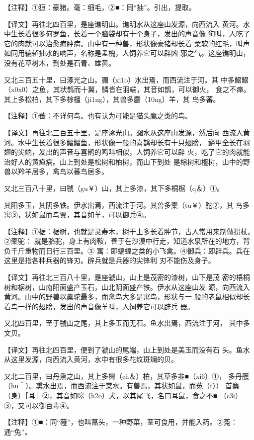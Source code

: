 \documentclass[a4paper,12pt,UTF8,twoside]{ctexbook}
\begin{document}
【注释】①狟：豪猪。毫：细毛，②■：同“抽”。引出，提取。

【译文】再往北四百里，是座谯明山。谯明水从这座山发源，向西流入 黄河。水中生长着很多何罗鱼，长着一个脑袋却有十个身子，发出的声音像 狗叫，人吃了它的肉就可以治愈痈肿病。山中有一种兽，形状像豪猪却长着 柔软的红毛，叫声如同用辘轳抽水的响声，名称是孟槐，人饲养它可以辟凶 邪之气。这座谯明山，没有花草树木，到处是石青、雄黄。

又北三百五十里，曰涿光之山。嚻（xi1o）水出焉，而西流注于河。其 中多鰼鰼（x0x0）之鱼，其状鹊而十翼，鳞皆在羽端，其音如鹊，可以御火， 食之不瘅。其上多松柏，其下多棕橿（ji1ng），其兽多麢（10ng）羊，其 鸟多蕃。

【注释】①蕃：不详何鸟。也有认为可能是猫头鹰之类的鸟。

【译文】再往北三百五十里，是座涿光山。嚻水从这座山发源，然后向 西流入黄河。水中生长着很多鳛鳛鱼，形状像一般的喜鹊却长有十只翅膀， 鳞甲全长在羽翅的尖端，发出的声音与喜鹊的鸣叫相似，人饲养它可以辟 火，吃了它的肉就能治好人的黄疸病。山上到处是松树和柏树，而山下到处 是棕树和橿树，山中的野兽以羚羊居多，禽鸟以蕃鸟居多。

又北三百八十里，曰虢（gu￥）山，其上多漆，其下多桐椐（q＆）①。

其阳多玉，其阴多铁。伊水出焉，西流注于河。其兽多橐（tu￥）驼②，其 鸟多寓③，状如鼠而鸟翼，其音如羊，可以御兵④。

【注释】①椐：椐树，也就是灵寿木，树干上多长着肿节，古人常用来制做拐杖。②橐驼： 就是骆驼，身上有肉鞍，善于在沙漠中行走，知道水泉所在的地方，背负千斤重物而日行三百里。③ 寓：即蝙蝠之类的小飞禽。④御兵：即辟兵。兵在这里是指各种兵器的锋刃。辟兵就是兵器的尖锋利 刃不能伤及身子。

【译文】再往北三百八十里，是座虢山，山上是茂密的漆树，山下是茂 密的梧桐树和椐树，山南阳面盛产玉石，山北阴面盛产铁。伊水从这座山发 源，向西流入黄河。山中的野兽以橐驼最多，而禽鸟大多是寓鸟，形状与一 般的老鼠相似却长着鸟一样的翅膀，发出的声音像羊叫，人饲养它可以辟兵 器。

又北四百里，至于虢山之尾，其上多玉而无石。鱼水出焉，西流注于河， 其中多文贝。

【译文】再往北四百里，便到了虢山的尾端，山上到处是美玉而没有石 头。鱼水从这里发源，向西流入黄河，水中有很多花纹斑斓的贝。

又北二百里，曰丹熏之山，其上多樗（ch＆）柏，其草多韭■（xi6）①， 多丹雘（hu＾）。熏水出焉，而西流注于棠水。有兽焉，其状如鼠，而菟（t）） 首麋（身）［耳］②，其音如嗥（h2o）犬，以其尾飞，名曰耳鼠，食之不■ （c3i）③，又可以御百毒④。

【注释】①■：同“薤”，也叫蕌头，一种野菜，茎可食用，并能入药。②菟：通“兔”。
\end{document}
